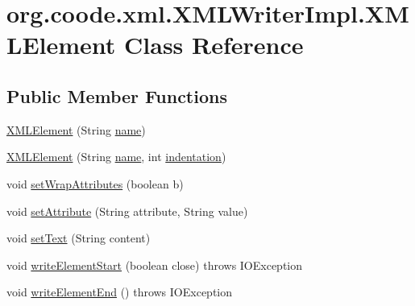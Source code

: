 \hypertarget{classorg_1_1coode_1_1xml_1_1_x_m_l_writer_impl_1_1_x_m_l_element}{\section{org.\-coode.\-xml.\-X\-M\-L\-Writer\-Impl.\-X\-M\-L\-Element Class Reference}
\label{classorg_1_1coode_1_1xml_1_1_x_m_l_writer_impl_1_1_x_m_l_element}
}
\subsection*{Public Member Functions}
\begin{DoxyCompactItemize}
\item 
\hyperlink{classorg_1_1coode_1_1xml_1_1_x_m_l_writer_impl_1_1_x_m_l_element_aff32adc743a8fc6004989e6434284567}{X\-M\-L\-Element} (String \hyperlink{classorg_1_1coode_1_1xml_1_1_x_m_l_writer_impl_1_1_x_m_l_element_a565d2d6336e28710f569f86f16f2612f}{name})
\item 
\hyperlink{classorg_1_1coode_1_1xml_1_1_x_m_l_writer_impl_1_1_x_m_l_element_a1c261a50a0cea419d85396f540c065a4}{X\-M\-L\-Element} (String \hyperlink{classorg_1_1coode_1_1xml_1_1_x_m_l_writer_impl_1_1_x_m_l_element_a565d2d6336e28710f569f86f16f2612f}{name}, int \hyperlink{classorg_1_1coode_1_1xml_1_1_x_m_l_writer_impl_1_1_x_m_l_element_a82425e44b543f2e3291aa5539766241f}{indentation})
\item 
void \hyperlink{classorg_1_1coode_1_1xml_1_1_x_m_l_writer_impl_1_1_x_m_l_element_acc908e8ea62b3c71517ce5757f9c05ac}{set\-Wrap\-Attributes} (boolean b)
\item 
void \hyperlink{classorg_1_1coode_1_1xml_1_1_x_m_l_writer_impl_1_1_x_m_l_element_a3334be3dcf2f684494c87ce1dcd6a047}{set\-Attribute} (String attribute, String value)
\item 
void \hyperlink{classorg_1_1coode_1_1xml_1_1_x_m_l_writer_impl_1_1_x_m_l_element_a157a59f1b0d6cca5a8f4544c4805f158}{set\-Text} (String content)
\item 
void \hyperlink{classorg_1_1coode_1_1xml_1_1_x_m_l_writer_impl_1_1_x_m_l_element_a33a8c9a0778bfd843c6da1d89f91a698}{write\-Element\-Start} (boolean close)  throws I\-O\-Exception 
\item 
void \hyperlink{classorg_1_1coode_1_1xml_1_1_x_m_l_writer_impl_1_1_x_m_l_element_a9927a4cf12bceda85d94af6cec79042e}{write\-Element\-End} ()  throws I\-O\-Exception 
\end{DoxyCompactItemize}
